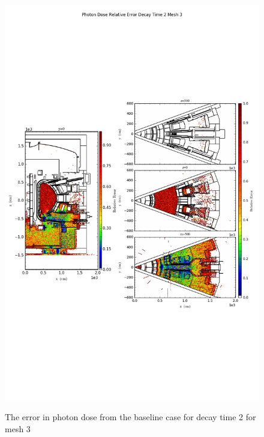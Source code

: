 \begin{figure}[ht!]
\centering
\includegraphics[trim={0cm 9cm 0cm 10cm},clip,scale=0.75]{../plots/final_model_nob4c/Photon_Dose_Relative_Error_Decay_Time_2_Mesh_3.png}
\label{fig:photons_dc2_no4bc_m3_error}
\caption{The error in photon dose from the baseline case for decay time 2 for mesh 3}
\end{figure}
